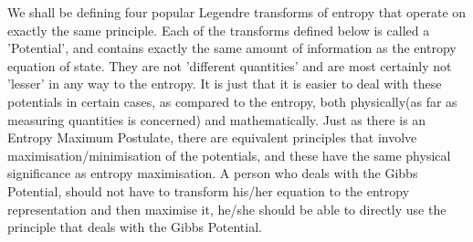 \documentclass[oneside]{book}
\begin{document}
We shall be defining four popular Legendre transforms of entropy that operate on exactly the same principle. Each of the transforms defined below is called a 'Potential', and contains exactly the same amount of information as the entropy equation of state. They are not 'different quantities' and are most certainly not 'lesser' in any way to the entropy. It is just that it is easier to deal with these potentials in certain cases, as compared to the entropy, both physically(as far as measuring quantities is concerned) and mathematically. Just as there is an Entropy Maximum Postulate, there are equivalent principles that involve maximisation/minimisation of the potentials, and these have the same physical significance as entropy maximisation. A person who deals with the Gibbs Potential,  should not have to transform his/her equation to the entropy representation and then maximise it, he/she should be able to directly use the principle that deals with the Gibbs Potential.
\\
\end{document}
